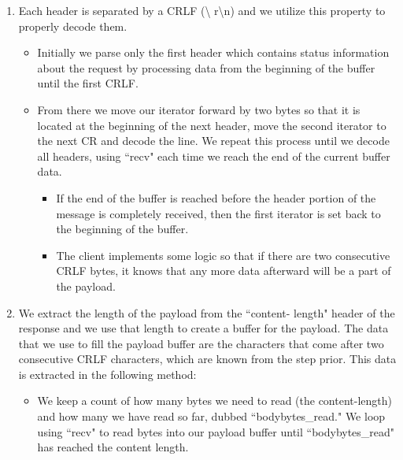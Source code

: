 \documentclass{article}
\begin{document}
        \begin{enumerate}
            \item Each header is separated by a CRLF (\textbackslash
                r\textbackslash n) and we utilize this property to properly
                decode them.
            \begin{itemize}
                \item Initially we parse only the first header which contains
                    status information about the request by processing data
                    from the beginning of the buffer until the first CRLF.
                \item From there we move our iterator forward by two bytes so
                    that it is located at the beginning of the next header,
                    move the second iterator to the next CR and decode the
                    line. We repeat this process until we decode all headers,
                    using ``recv" each time we reach the end of the current
                    buffer data.
                \begin{itemize}
                    \item If the end of the buffer is reached before the header
                        portion of the message is completely received, then the
                        first iterator is set back to the beginning of the
                        buffer.
                    
                    \item The client implements some logic so that if there are
                        two consecutive CRLF bytes, it knows that any more data
                        afterward will be a part of the payload.
                \end{itemize}
            \end{itemize}

            \item We extract the length of the payload from the ``content-
                length" header of the response and we use that length to create
                a buffer for the payload. The data that we use to fill the
                payload buffer are the characters that come after two
                consecutive CRLF characters, which are known from the step
                prior. This data is extracted in the following method:
            \begin{itemize}
                \item We keep a count of how many bytes we need to read (the
                    content-length) and how many we have read so far, dubbed
                    ``bodybytes\_read."  We loop using ``recv" to read bytes
                    into our payload buffer until ``bodybytes\_read" has
                    reached the content length.
                

\end{itemize}
\end{enumerate}
\end{document}
